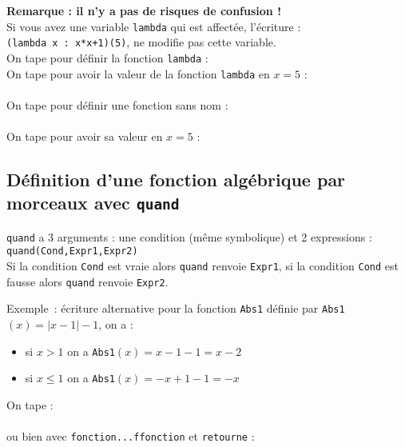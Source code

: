 \documentclass[12pt,a4paper]{book}
\begin{document}
\begin{giacjshere}
{\bf Remarque : il n'y a pas de risques de confusion !} \\
Si vous avez une variable {\tt lambda} qui est affect\'ee, l'\'ecriture :\\
{\tt (lambda x  : x*x+1)(5)}, ne modifie pas cette variable.\\
On tape pour d\'efinir la fonction {\tt lambda} :\\
On tape pour avoir la valeur de la fonction {\tt lambda} en $x=5$ :\\
\\
On tape pour d\'efinir une fonction sans nom :\\
\\
On tape pour avoir sa valeur en $x=5$ :\\

\subsection{D\'efinition d'une fonction alg\'ebrique par morceaux avec {\tt quand}}
{\tt quand} a 3 arguments : une condition (m\^eme symbolique) et 2 expressions : \\
{\tt quand(Cond,Expr1,Expr2)}\\
Si la condition {\tt Cond} est vraie alors {\tt quand} renvoie {\tt Expr1},
si la condition {\tt Cond} est fausse alors {\tt quand} renvoie {\tt Expr2}.

Exemple~: \'ecriture alternative pour la fonction {\tt Abs1} 
d\'efinie par {\tt Abs1}$(x)=|x-1|-1$, on a :
\begin{itemize}
\item si $x>1$ on a {\tt Abs1}$(x)=x-1-1=x-2$
\item si $x \leq 1$ on a {\tt Abs1}$(x)=-x+1-1=-x$
\end{itemize}
On tape :\\
\\
ou bien  avec {\tt fonction...ffonction} et {\tt retourne} : \\
\\
\\
\\


\end{giacjshere}
\end{document}
